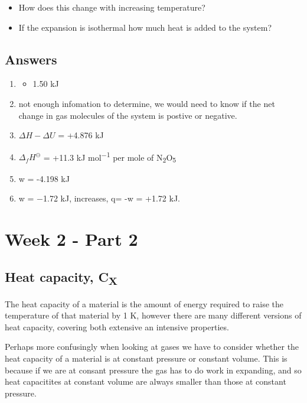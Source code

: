 \documentclass[
]{book}
\providecommand{\tightlist}{%
  \setlength{\itemsep}{0pt}\setlength{\parskip}{0pt}}
\begin{document}
\begin{itemize}
\tightlist
\item
  How does this change with increasing temperature?
\item
  If the expansion is isothermal how much heat is added to the system?
\end{itemize}

\hypertarget{answers-1}{%
\section{Answers}\label{answers-1}}

\begin{enumerate}
\def\labelenumi{\arabic{enumi}.}
\item
  \begin{itemize}
  \tightlist
  \item
    1.50 kJ
  \end{itemize}
\item
  not enough infomation to determine, we would need to know if the net change in gas molecules of the system is postive or negative.
\item
  \(\Delta H - \Delta U\) = +4.876 kJ
\item
  \(Δ_fH^\ominus\) = +11.3 kJ mol\textsuperscript{−1} per mole of N\textsubscript{2}O\textsubscript{5}
\item
  w = -4.198 kJ
\item
  w = −1.72 kJ, increases, q= -w = +1.72 kJ.
\end{enumerate}

\hypertarget{ch:Part4}{%
\chapter{Week 2 - Part 2}\label{ch:Part4}}

\hypertarget{heat-capacity-cx}{%
\section{\texorpdfstring{Heat capacity, C\textsubscript{X}}{Heat capacity, CX}}\label{heat-capacity-cx}}

The heat capacity of a material is the amount of energy required to raise the temperature of that material by 1 K, however there are many different versions of heat capacity, covering both extensive an intensive properties.

Perhaps more confusingly when looking at gases we have to consider whether the heat capacity of a material is at constant pressure or constant volume. This is because if we are at consant pressure the gas has to do work in expanding, and so heat capacitites at constant volume are always smaller than those at constant pressure.
\end{document}
